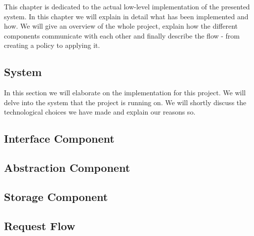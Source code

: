 This chapter is dedicated to the actual low-level implementation of the presented system. In this chapter we will explain in detail what has been implemented and how. We will give an overview of the whole project, explain how the different components communicate with each other and finally describe the flow - from creating a policy to applying it. 

\subsection{System}
In this section we will elaborate on the implementation for this project. We will delve into the system that the project is running on. We will shortly discuss the technological choices we have made and explain our reasons so.



\subsection{Interface Component}

\subsection{Abstraction Component}

\subsection{Storage Component}

\subsection{Request Flow}